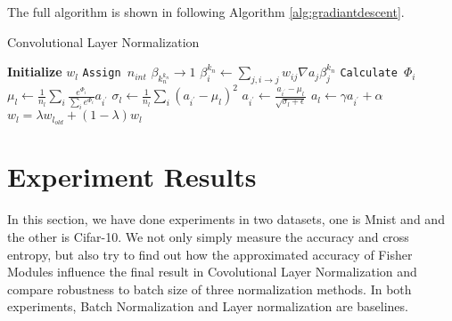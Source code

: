 \documentclass{sig-alternate}
\begin{document}
    The full algorithm is shown in following Algorithm \ref{alg:gradiantdescent}.

    \begin{algorithm}
        \caption{Convolutional Layer Normalization}\label{alg:gradiantdescent}
        \begin {algorithmic}[1]
            \STATE \textbf{Initialize} $w_l$
            \STATE \texttt{Assign $n_{int}$}
            \STATE $\beta_k_n^{k_n} \rightarrow 1$
                \STATE \texttt{$\beta_{i}^{k_n} \leftarrow \sum_{j, i\rightarrow j}w_{ij}\nabla a_j \beta_j^{k_n}$}
                \STATE \texttt{Calculate $\Phi_{i}$}
            \ENDFOR
            \STATE \texttt{$\mu_l \leftarrow \frac{1}{n_{l}}\sum_i \frac{e^{\Phi_i}}{\sum_i e^{\Phi_i}}a_{i^{'}}$}
            \STATE \texttt{$\sigma_l \leftarrow \frac{1}{n_l}\sum_i (a_{i^{'}}-\mu_l)^{2}$}
            \STATE \texttt{$a_{i^{'}}\leftarrow \frac{a_{i^{'}}-\mu_l}{\sqrt{\sigma_l+\epsilon}}$}
            \STATE \texttt{$a_l \leftarrow \gamma a_{i^{'}} + \alpha$}
                \STATE \texttt{$w_l = \lambda w_{l_{old}} + (1-\lambda)w_l$}
            \ENDWHILE
            
        \end{algorithmic}
        
    \end{algorithm}

\section{Experiment Results}
    In this section, we have done experiments in two datasets, one is Mnist and and the other is Cifar-10. We not only simply measure the accuracy and cross entropy, but also try to find out how the approximated accuracy of Fisher Modules influence the final result in Covolutional Layer Normalization and compare robustness to batch size of three normalization methods. In both experiments, Batch Normalization and Layer normalization are baselines. 
\end{document}
